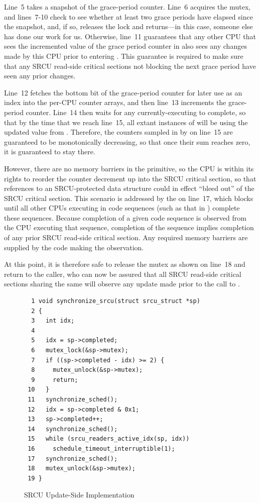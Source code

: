 Line~5 takes a snapshot of the grace-period counter.
Line~6 acquires the mutex, and lines~7-10 check to see whether
at least two grace periods have elapsed since the snapshot,
and, if so, releases the lock and returns---in this case, someone
else has done our work for us.
Otherwise, line~11 guarantees that any other CPU that sees the
incremented value of the grace period counter in 
also sees any changes made by this CPU prior to entering
.
This guarantee is required to make sure that any SRCU read-side
critical sections not blocking the next grace period have seen
any prior changes.

Line~12 fetches the bottom bit of the grace-period counter for later
use as an index into the per-CPU counter arrays, and then line~13
increments the grace-period counter.
Line~14 then waits for any currently-executing 
to complete, so that by the time that we reach line~15, all
extant instances of  will be using the updated
value from .
Therefore, the counters sampled in by 
on line~15 are guaranteed to
be monotonically decreasing, so that once their sum reaches zero, it
is guaranteed to stay there.

However, there are no memory barriers in the 
primitive, so the CPU is within its rights to reorder the counter
decrement up into the SRCU critical section, so that references to
an SRCU-protected data structure could in effect ``bleed out'' of the
SRCU critical section.
This scenario is addressed by the  on line~17,
which blocks until all other CPUs executing in 
code sequences (such as that in ) complete these
sequences.
Because completion of a given  code sequence
is observed from the CPU executing that sequence, completion of the
sequence implies completion of any prior SRCU read-side critical section.
Any required memory barriers are supplied by the code making the
observation.

At this point, it is therefore safe to release the mutex as shown
on line~18 and return to the caller, who can now be assured that
all SRCU read-side critical sections sharing the same
 
will observe any update made prior to the call to .

\begin{figure}[htbp]
{ \scriptsize
\begin{verbatim}
  1 void synchronize_srcu(struct srcu_struct *sp)
  2 {
  3   int idx;
  4
  5   idx = sp->completed;
  6   mutex_lock(&sp->mutex);
  7   if ((sp->completed - idx) >= 2) {
  8     mutex_unlock(&sp->mutex);
  9     return;
 10   }
 11   synchronize_sched();
 12   idx = sp->completed & 0x1;
 13   sp->completed++;
 14   synchronize_sched();
 15   while (srcu_readers_active_idx(sp, idx))
 16     schedule_timeout_interruptible(1);
 17   synchronize_sched();
 18   mutex_unlock(&sp->mutex);
 19 }
\end{verbatim}
}
\caption{SRCU Update-Side Implementation}
\label{fig:app:rcuimpl:Update-Side Implementation}
\end{figure}

